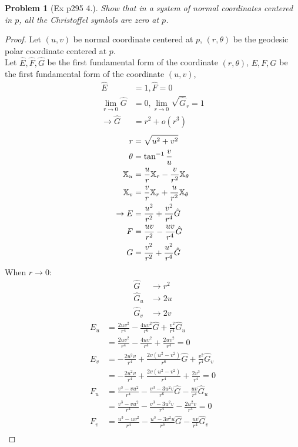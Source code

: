 \documentclass[10pt,a4paper]{article}
\newcounter{theProblemCounter}
\newtheorem{problem}[theProblemCounter]{Problem}
\begin{document}
\setcounter{theProblemCounter}{3}
\begin{problem}[Ex p295 4.]
Show that in a system of normal coordinates centered in $p$, all the Christoffel symbols are zero at $p$.
\end{problem}
\begin{proof}
Let $(u,v)$ be normal coordinate centered at $p$, $(r,\theta)$ be the geodesic polar coordinate centered at $p$.\\
Let $\hat{E}, \hat{F}, \hat{G}$ be the first fundamental form of the coordinate $(r,\theta)$, $E, F, G$ be the first fundamental form of the coordinate $(u,v)$,
\begin{align*}
\hat{E}&=1, \hat{F}=0\\
\lim_{r\to 0}\hat{G}&=0, \lim_{r\to 0}\sqrt{\hat{G}}_r=1\\
\rightarrow \hat{G}&=r^2+o(r^3)
\end{align*}
\begin{align*}
r&=\sqrt{u^2+v^2}\\
\theta&=\tan^{-1}{\frac{v}{u}}\\
\mathbb{X}_u&=\frac{u}{r}\mathbb{X}_r-\frac{v}{r^2}\mathbb{X}_\theta\\
\mathbb{X}_v&=\frac{v}{r}\mathbb{X}_r+\frac{u}{r^2}\mathbb{X}_\theta\\
\rightarrow E&=\frac{u^2}{r^2}+\frac{v^2}{r^4}\hat{G}\\
F&=\frac{uv}{r^2}-\frac{uv}{r^4}\hat{G}\\
G&=\frac{v^2}{r^2}+\frac{u^2}{r^4}\hat{G}
\end{align*}
When $r\to 0$:
\begin{align*}
\hat{G}&\to r^2\\
\hat{G}_u&\to 2u\\
\hat{G}_v&\to 2v
\end{align*}
\begin{align*}
E_u&=\frac{2uv^2}{r^4}-\frac{4uv^2}{r^6}\hat{G}+\frac{v^2}{r^4}\hat{G}_u\\
&=\frac{2uv^2}{r^4}-\frac{4uv^2}{r^4}+\frac{2uv^2}{r^4}=0\\
E_v&=-\frac{2u^2v}{r^4}+\frac{2v(u^2-v^2)}{r^6}\hat{G}+\frac{v^2}{r^4}\hat{G}_v\\
&=-\frac{2u^2v}{r^4}+\frac{2v(u^2-v^2)}{r^4}+\frac{2v^3}{r^4}=0\\
F_u&=\frac{v^3-vu^2}{r^4}-\frac{v^3-3u^2v}{r^6}\hat{G}-\frac{uv}{r^4}\hat{G}_u\\
&=\frac{v^3-vu^2}{r^4}-\frac{v^3-3u^2v}{r^4}-\frac{2u^2v}{r^4}=0\\
F_v&=\frac{u^3-uv^2}{r^4}-\frac{u^3-3v^2u}{r^6}\hat{G}-\frac{uv}{r^4}\hat{G}_v\\

\end{align*}
\end{proof}
\end{document}
